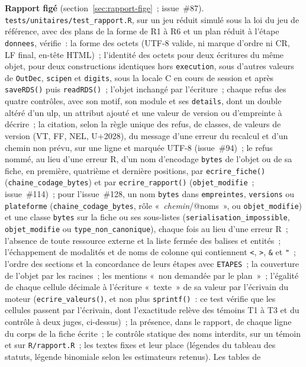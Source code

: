 \documentclass[a4paper,11pt]{article}
\newcommand{\code}[1]{\texttt{\small #1}}
\begin{document}
\medskip
{\sloppy \textbf{Rapport figé} (section~\ref{sec:rapport-fige}~;
issue~\#87). \code{tests/unitaires/test\_rapport.R}, sur un jeu réduit
simulé sous la loi du jeu de référence, avec des plans de la forme de R1 à
R6 et un plan réduit à l'étape \code{donnees}, vérifie~: la forme des octets
(UTF-8 valide, ni marque d'ordre ni CR, LF final, en-tête HTML)~; l'identité
des octets pour deux écritures du même objet, pour deux constructions
identiques hors \code{execution}, sous d'autres valeurs de \code{OutDec},
\code{scipen} et \code{digits}, sous la locale C en cours de session et
après \code{saveRDS()} puis \code{readRDS()}~; l'objet inchangé par
l'écriture~; chaque refus des quatre contrôles, avec son motif, son module
et ses \code{details}, dont un double altéré d'un ulp, un attribut ajouté et
une valeur de version ou d'empreinte à décrire~; la citation, selon la
règle unique des refus, de classes, de valeurs de version (VT, FF, NEL,
U+2028), du message d'une erreur du recalcul et d'un chemin non prévu, sur
une ligne et marquée UTF-8 (issue~\#94)~; le refus nommé, au lieu d'une
erreur R, d'un nom d'encodage \code{bytes} de l'objet ou de sa fiche, en
première, quatrième et dernière positions, par \code{ecrire\_fiche()}
(\code{chaine\_codage\_bytes}) et par \code{ecrire\_rapport()}
(\code{objet\_modifie}~; issue~\#114)~; pour l'issue~\#128, un nom
\code{bytes} dans \code{empreintes}, \code{versions} ou
\code{plateforme} (\code{chaine\_codage\_bytes}, rôle
«~\emph{chemin}/@noms~», ou \code{objet\_modifie}) et une classe
\code{bytes} sur la fiche ou ses sous-listes
(\code{serialisation\_impossible}, \code{objet\_modifie} ou
\code{type\_non\_canonique}), chaque fois au lieu d'une erreur R~; l'absence de toute
ressource externe et la liste fermée des balises et entités~;
l'échappement de modalités et de noms de colonne qui contiennent
\code{<}, \code{>}, \code{\&} et \code{"}~; l'ordre des sections et la
concordance de leurs étapes avec \code{ETAPES}~; la couverture de l'objet par
les racines~; les mentions «~non demandée par le plan~»~; l'égalité de
chaque cellule décimale à l'écriture «~texte~» de sa valeur par l'écrivain
du moteur (\code{ecrire\_valeurs()}, et non plus \code{sprintf()}~: ce
test vérifie que les cellules passent par l'écrivain, dont l'exactitude
relève des témoins T1 à T3 et du contrôle à deux juges, ci-dessus)~; la
présence, dans le rapport, de chaque ligne du corps de la fiche écrite~; le
contrôle statique des noms interdits, sur un témoin et sur
\code{R/rapport.R}~; les textes fixes et leur place (légendes du tableau des
statuts, légende binomiale selon les estimateurs retenus). Les tables de
}
\end{document}
